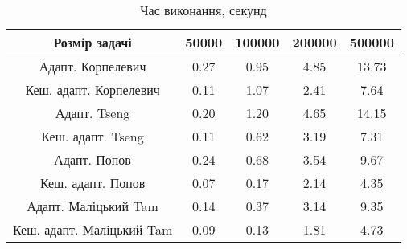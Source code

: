 \begin{table}[H]
	\centering
	\begin{tabular}{|c||c|c|c|c|}\hline
		Розмір задачі & 50000 & 100000 & 200000 & 500000 \\ \hline \hline
		Адапт. Корпелевич & 0.27 & 0.95 & 4.85 & 13.73 \\ \hline
		Кеш. адапт. Корпелевич & 0.11 & 1.07 & 2.41 & 7.64 \\ \hline
		Адапт. Tseng & 0.20 & 1.20 & 4.65 & 14.15 \\ \hline
		Кеш. адапт. Tseng & 0.11 & 0.62 & 3.19 & 7.31 \\ \hline
		Адапт. Попов & 0.24 & 0.68 & 3.54 & 9.67 \\ \hline
		Кеш. адапт. Попов & 0.07 & 0.17 & 2.14 & 4.35 \\ \hline
		Адапт. Маліцький Tam & 0.14 & 0.37 & 3.14 & 9.35 \\ \hline
		Кеш. адапт. Маліцький Tam & 0.09 & 0.13 & 1.81 & 4.73 \\ \hline
	\end{tabular}
	\caption{Час виконання, секунд}
\end{table}
